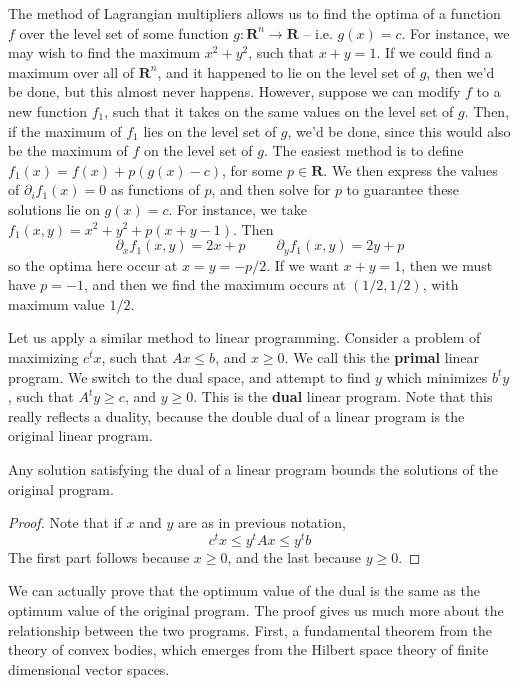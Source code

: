 The method of Lagrangian multipliers allows us to find the optima of a function $f$ over the level set of some function $g: \mathbf{R}^n \to \mathbf{R}$ -- i.e. $g(x) = c$. For instance, we may wish to find the maximum $x^2 + y^2$, such that $x + y = 1$. If we could find a maximum over all of $\mathbf{R}^n$, and it happened to lie on the level set of $g$, then we'd be done, but this almost never happens. However, suppose we can modify $f$ to a new function $f_1$, such that it takes on the same values on the level set of $g$. Then, if the maximum of $f_1$ lies on the level set of $g$, we'd be done, since this would also be the maximum of $f$ on the level set of $g$. The easiest method is to define $f_1(x) = f(x) + p(g(x) - c)$, for some $p \in \mathbf{R}$. We then express the values of $\partial_i f_1(x) = 0$ as functions of $p$, and then solve for $p$ to guarantee these solutions lie on $g(x) = c$. For instance, we take $f_1(x,y) = x^2 + y^2 + p(x + y - 1)$. Then
%
\[ \partial_x f_1(x,y) = 2x + p\ \ \ \ \ \ \ \ \ \ \partial_y f_1(x,y) = 2y + p \]
%
so the optima here occur at $x = y = -p/2$. If we want $x + y = 1$, then we must have $p = -1$, and then we find the maximum occurs at $(1/2,1/2)$, with maximum value $1/2$.

Let us apply a similar method to linear programming. Consider a problem of maximizing $c^t x$, such that $Ax \leq b$, and $x \geq 0$. We call this the {\bf primal} linear program. We switch to the dual space, and attempt to find $y$ which minimizes $b^t y$, such that $A^t y \geq c$, and $y \geq 0$. This is the {\bf dual} linear program. Note that this really reflects a duality, because the double dual of a linear program is the original linear program.

\begin{theorem}
    Any solution satisfying the dual of a linear program bounds the solutions of the original program.
\end{theorem}
\begin{proof}
    Note that if $x$ and $y$ are as in previous notation,
    \[ c^t x \leq y^t A x \leq y^t b \]
    The first part follows because $x \geq 0$, and the last because $y \geq 0$.
\end{proof}

We can actually prove that the optimum value of the dual is the same as the optimum value of the original program. The proof gives us much more about the relationship between the two programs. First, a fundamental theorem from the theory of convex bodies, which emerges from the Hilbert space theory of finite dimensional vector spaces.


